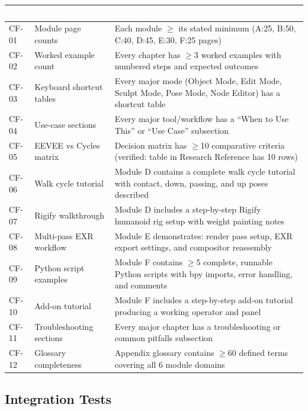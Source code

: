 \documentclass[11pt,letterpaper]{article}
\newcommand{\tableheader}[1]{\textbf{\sffamily\textcolor{white}{#1}}}
\begin{document}
\begin{center}
\begin{tabularx}{\textwidth}{L{1.5cm}L{4cm}X}
\toprule
{}
\tableheader{ID} & \tableheader{Verifies} & \tableheader{Expected} \\
\midrule
CF-01 & Module page counts & Each module $\geq$ its stated minimum (A:25, B:50, C:40, D:45, E:30, F:25 pages) \\
CF-02 & Worked example count & Every chapter has $\geq$3 worked examples with numbered steps and expected outcomes \\
CF-03 & Keyboard shortcut tables & Every major mode (Object Mode, Edit Mode, Sculpt Mode, Pose Mode, Node Editor) has a shortcut table \\
CF-04 & Use-case sections & Every major tool/workflow has a ``When to Use This'' or ``Use Case'' subsection \\
CF-05 & EEVEE vs Cycles matrix & Decision matrix has $\geq$10 comparative criteria (verified: table in Research Reference has 10 rows) \\
CF-06 & Walk cycle tutorial & Module D contains a complete walk cycle tutorial with contact, down, passing, and up poses described \\
CF-07 & Rigify walkthrough & Module D includes a step-by-step Rigify humanoid rig setup with weight painting notes \\
CF-08 & Multi-pass EXR workflow & Module E demonstrates: render pass setup, EXR export settings, and compositor reassembly \\
CF-09 & Python script examples & Module F contains $\geq$5 complete, runnable Python scripts with bpy imports, error handling, and comments \\
CF-10 & Add-on tutorial & Module F includes a step-by-step add-on tutorial producing a working operator and panel \\
CF-11 & Troubleshooting sections & Every major chapter has a troubleshooting or common pitfalls subsection \\
CF-12 & Glossary completeness & Appendix glossary contains $\geq$60 defined terms covering all 6 module domains \\
\bottomrule
\end{tabularx}
\end{center}

\subsection{Integration Tests}
\end{document}
